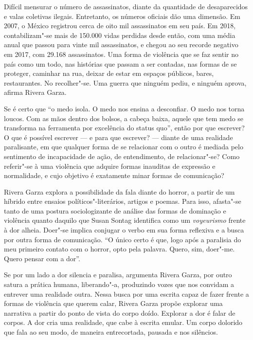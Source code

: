 Difícil mensurar o número de assassinatos, diante da quantidade de
desaparecidos e valas coletivas ilegais. Entretanto, os números oficiais
dão uma dimensão. Em 2007, o México registrou cerca de oito mil
assassinatos em seu país. Em 2018, contabilizam"-se mais de 150.000 vidas
perdidas desde então, com uma média anual que passou para vinte mil
assassinatos, e chegou ao seu recorde negativo em 2017, com 29.168
assassinatos. Uma forma de violência que se faz sentir no país como um
todo, nas histórias que passam a ser contadas, nas formas de se
proteger, caminhar na rua, deixar de estar em espaços públicos, bares,
restaurantes. No recolher"-se. Uma guerra que ninguém pediu, e ninguém
aprova, afirma Rivera Garza.

Se é certo que ``o medo isola. O medo nos ensina a desconfiar. O medo
nos torna loucos. Com as mãos dentro dos bolsos, a cabeça baixa, aquele
que tem medo se transforma na ferramenta por excelência do status quo'',
então por que escrever? O que é possível escrever --- e para que
escrever? --- diante de uma realidade paralisante, em que qualquer forma
de se relacionar com o outro é mediada pelo sentimento de incapacidade
de ação, de entendimento, de relacionar"-se? Como referir"-se à uma
violência que adquire formas inauditas de expressão e normalidade, e
cujo objetivo é exatamente minar formas de comunicação?

Rivera Garza explora a possibilidade da fala diante do
horror, a partir de um híbrido entre ensaios políticos"-literários,
artigos e poemas. Para isso, afasta"-se tanto de uma postura
sociologizante de análise das formas de dominação e violência quanto
daquilo que Susan Sontag identifica como um \emph{voyeurismo} frente à dor
alheia. Doer"-se implica conjugar o verbo em sua forma reflexiva e
a busca por outra forma de
comunicação. ``O único
certo é que, logo após a paralisia do meu primeiro contato com o horror,
opto pela palavra. Quero, sim, doer"-me. Quero pensar com a dor''.

Se por um lado a dor silencia e paralisa, argumenta Rivera
Garza, por outro satura a prática humana, liberando"-a, produzindo vozes
que nos convidam a entrever uma realidade outra. Nessa busca por uma
escrita capaz de fazer frente a formas de violência que
querem calar, Rivera Garza propõe explorar uma narrativa a partir do
ponto de vista do corpo doído. Explorar a dor é falar de corpos. A dor
cria uma realidade, que cabe à escrita emular. Um corpo dolorido que
fala ao seu modo, de maneira entrecortada, pausada e nos silêncios.

